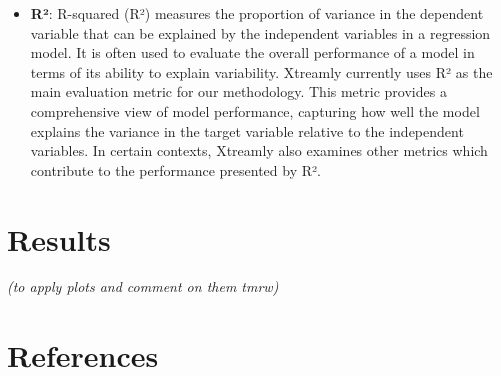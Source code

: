 \documentclass[8pt]{article}
\begin{document}
\begin{multicols}{2}
\begin{itemize}
			\item \textbf{R²}: R-squared (R²) measures the proportion of variance in the dependent variable that can be explained by the independent variables in a regression model. It is often used to evaluate the overall performance of a model in terms of its ability to explain variability.
			\smallskip
			\newline
			Xtreamly currently uses R² as the main evaluation metric for our methodology. This metric provides a comprehensive view of model performance, capturing how well the model explains the variance in the target variable relative to the independent variables. In certain contexts, Xtreamly also examines other metrics which contribute to the performance presented by R².
		\end{itemize}

\section{Results}
\textit{(to apply plots and comment on them tmrw)}
		
	\end{multicols}
	
\newpage
\section*{References}
\printbibliography[heading=none]
	
\end{document}
